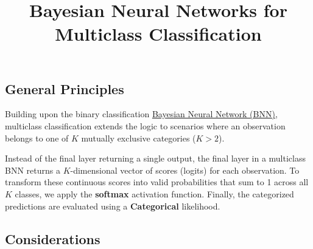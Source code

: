 \documentclass[
  letterpaper,
  DIV=11,
  numbers=noendperiod]{scrartcl}
\title{Bayesian Neural Networks for Multiclass Classification}
\author{}
\date{}
\begin{document}
\maketitle


\subsection{General Principles}\label{general-principles}

Building upon the binary classification
\href{29.\%20BNN\%20for\%20classification.qmd}{Bayesian Neural Network
(BNN)}, multiclass classification extends the logic to scenarios where
an observation belongs to one of \(K\) mutually exclusive categories
(\(K > 2\)).

Instead of the final layer returning a single output, the final layer in
a multiclass BNN returns a \(K\)-dimensional vector of scores (logits)
for each observation. To transform these continuous scores into valid
probabilities that sum to 1 across all \(K\) classes, we apply the
\textbf{softmax} activation function. Finally, the categorized
predictions are evaluated using a \textbf{Categorical} likelihood.

\subsection{Considerations}\label{considerations}
\end{document}
